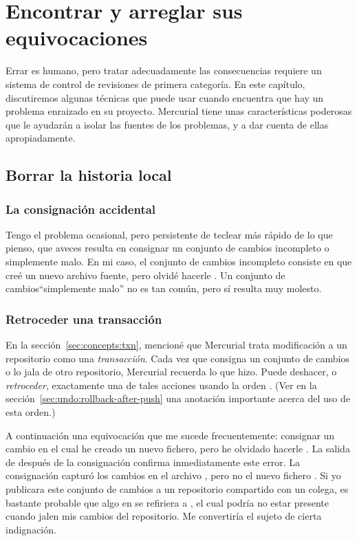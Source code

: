 \chapter{Encontrar y arreglar sus equivocaciones}
\label{chap:undo}

Errar es humano, pero tratar adecuadamente las consecuencias requiere
un sistema de control de revisiones de primera categoría.  En este
capítulo, discutiremos algunas técnicas que puede usar cuando
encuentra que hay un problema enraizado en su proyecto.  Mercurial
tiene unas características poderosas que le ayudarán a isolar las
fuentes de los problemas, y a dar cuenta de ellas apropiadamente.

\section{Borrar la historia local}

\subsection{La consignación accidental}

Tengo el problema ocasional, pero persistente de teclear más rápido de
lo que pienso, que aveces resulta en consignar un conjunto de cambios
incompleto o simplemente malo. En mi caso, el conjunto de cambios
incompleto consiste en que creé un nuevo archivo fuente, pero olvidé
hacerle .  Un conjunto de cambios``simplemente malo'' no es
tan común, pero sí resulta muy molesto.

\subsection{Retroceder una transacción}
\label{sec:undo:rollback}

En la sección~\ref{sec:concepts:txn}, mencioné que Mercurial trata
modificación a un repositorio como una \emph{transacción}.  Cada vez
que consigna un conjunto de cambios o lo jala de otro repositorio,
Mercurial recuerda lo que hizo.  Puede deshacer, o \emph{retroceder},
exactamente una de tales acciones usando la orden .
(Ver en la sección~\ref{sec:undo:rollback-after-push} una anotación
importante acerca del uso de esta orden.)

A continuación una equivocación que me sucede frecuentemente:
consignar un cambio en el cual he creado un nuevo fichero, pero he
olvidado hacerle .
La salida de  después de la consignación confirma
inmediatamente este error.
La consignación capturó los cambios en el archivo , pero
no el nuevo fichero .  Si yo publicara este conjunto de
cambios a un repositorio compartido con un colega, es bastante
probable que algo en  se refiriera a , el cual
podría no estar presente cuando jalen mis cambios del repositorio.  Me
convertiría el sujeto de cierta indignación.

